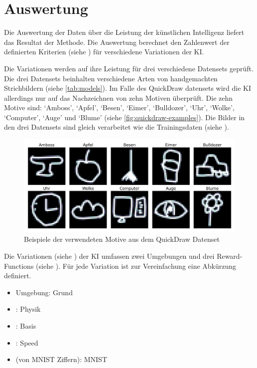 \section{Auswertung}\label{chap:m_auswert}
Die Auswertung der Daten über die Leistung der künstlichen Intelligenz liefert
das Resultat der Methode. Die Auswertung berechnet den Zahlenwert der
definierten Kriterien (siehe ) für verschiedene Variationen
der KI.

Die Variationen werden auf ihre Leistung für drei verschiedene Datensets
geprüft. Die drei Datensets beinhalten verschiedene Arten von handgemachten
Strichbildern (siehe \autoref{tab:models}). Im Falle des QuickDraw datensets
wird die KI allerdings nur auf das Nachzeichnen von zehn Motiven überprüft. Die
zehn Motive sind: `Amboss', `Apfel', `Besen', `Eimer', `Bulldozer', `Uhr',
`Wolke', `Computer', `Auge' und `Blume' (siehe
\autoref{fig:quickdraw-examples}). Die Bilder in den drei Datensets sind gleich
verarbeitet wie die Trainingsdaten (siehe ). 

\begin{figure}[!ht]
  \centering
  \includegraphics[width=\textwidth]{images/methode/quickdraw-examples.png}
  \caption{Beispiele der verwendeten Motive aus dem QuickDraw Datenset}
  \label{fig:quickdraw-examples}
\end{figure}


Die Variationen (siehe ) der KI umfassen zwei Umgebungen und
drei Reward-Functions (siehe ). Für jede Variation ist zur
Vereinfachung eine Abkürzung definiert.
\begin{itemize}
  \item {} Umgebung: Grund
  \item {}: Physik
  \item {}: Basis
  \item {}: Speed
  \item {} (von MNIST Ziffern): MNIST
\end{itemize}

